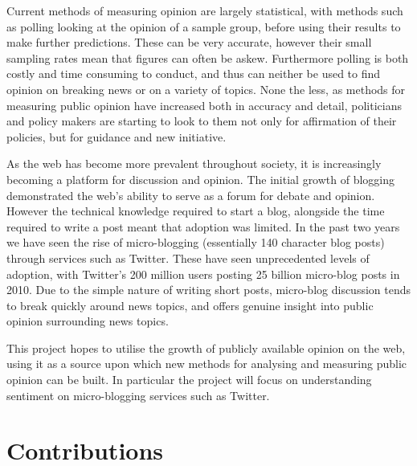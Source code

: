 Current methods of measuring opinion are largely statistical, with methods such as polling looking at the opinion of a sample group, before using their results to make further predictions. These can be very accurate, however their small sampling rates mean that figures can often be askew. Furthermore polling is both costly and time consuming to conduct, and thus can neither be used to find opinion on breaking news or on a variety of topics. None the less, as methods for measuring public opinion have increased both in accuracy and detail, politicians and policy makers are starting to look to them not only for affirmation of their policies, but for guidance and new initiative.

As the web has become more prevalent throughout society, it is increasingly becoming a platform for discussion and opinion. The initial growth of blogging demonstrated the web's ability to serve as a forum for debate and opinion. However the technical knowledge required to start a blog, alongside the time required to write a post meant that adoption was limited. In the past two years we have seen the rise of micro-blogging (essentially 140 character blog posts) through services such as Twitter. These have seen unprecedented levels of adoption, with Twitter's 200 million users posting 25 billion micro-blog posts in 2010. Due to the simple nature of writing short posts, micro-blog discussion tends to break quickly around news topics, and offers genuine insight into public opinion surrounding news topics.

This project hopes to utilise the growth of publicly available opinion on the web, using it as a source upon which new methods for analysing and measuring public opinion can be built. In particular the project will focus on understanding sentiment on micro-blogging services such as Twitter.

\section{Contributions}

